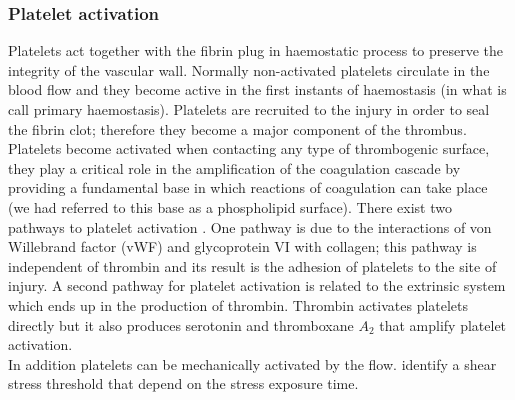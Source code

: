 \documentclass[%
 nofootinbib,
 amsmath,amssymb,
 aps,
 pra,
]{revtex4-1}
\begin{document}
\subsubsection{Platelet activation}
Platelets act together with the fibrin plug in haemostatic process to preserve the integrity of the vascular wall. Normally non-activated platelets circulate in the blood flow and they become active in the first instants of haemostasis (in what is call primary haemostasis). Platelets are recruited to the injury in order to seal the fibrin clot; therefore they become a major component of the thrombus. Platelets become activated when contacting any type of thrombogenic surface, they play a critical role in the amplification of the coagulation cascade by providing a fundamental base in which reactions of coagulation can take place (we had referred to this base as a phospholipid surface). There exist two pathways to platelet activation \citep{Furie:2008}. One pathway is due to the interactions of von Willebrand factor (vWF) and glycoprotein VI with collagen; this pathway is independent of thrombin and its result is the adhesion of platelets to the site of injury. A second pathway for platelet activation is related to the extrinsic system which ends up in the production of thrombin. Thrombin activates platelets directly but it also produces serotonin and thromboxane $A_{2}$ that amplify platelet activation.\\
In addition platelets can be mechanically activated by the flow. \citet{Hellums:1994} identify a shear stress threshold that depend on the stress exposure time.\\
\end{document}
